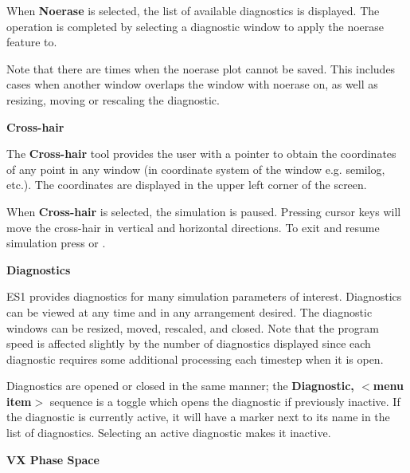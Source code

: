 \begin{section}
\begin{subsection}
\begin{subsubsection}
\noindent
      When {\bf Noerase} is selected, the list of available diagnostics is
      displayed.  The operation is completed by selecting a diagnostic window
      to apply the noerase feature to.
\vspace{.2in}

\noindent
      Note that there are times when the noerase plot cannot be saved.  This
      includes cases when another window overlaps the window with noerase on,
      as well as resizing, moving or rescaling the diagnostic.
\end{subsubsection}

\begin{subsubsection}
{\bf Cross-hair}

      The {\bf Cross-hair} tool provides the user with a pointer to obtain the
      coordinates of any point in any window (in coordinate system of the
      window e.g. semilog, etc.).  The coordinates are displayed in the upper
      left corner of the screen.
\vspace{.2in}

\noindent
      When {\bf Cross-hair} is selected, the simulation is paused.  
      Pressing cursor
      keys will move the cross-hair in vertical and horizontal directions.  To
      exit and resume simulation press  or .
\end{subsubsection}
\end{subsection}

\begin{subsection}
{\bf Diagnostics}

   ES1 provides diagnostics for many simulation parameters of interest.
   Diagnostics can be viewed at any time and in any arrangement desired.  The
   diagnostic windows can be resized, moved, rescaled, and closed.  Note that
   the program speed is affected slightly by the number of diagnostics
   displayed since each diagnostic requires some additional processing each
   timestep when it is open.
\vspace{.2in}

\noindent
   Diagnostics are opened or closed in the same manner; the 
   {\bf Diagnostic, $<$menu item$>$} sequence is a toggle which opens 
   the diagnostic if previously
   inactive.  If the diagnostic is currently active, it will 
   have a marker next
   to its name in the list of diagnostics.  Selecting an active diagnostic
   makes it inactive.

\begin{subsubsection}
{\bf VX Phase Space}


\end{subsubsection}
\end{subsection}
\end{section}
